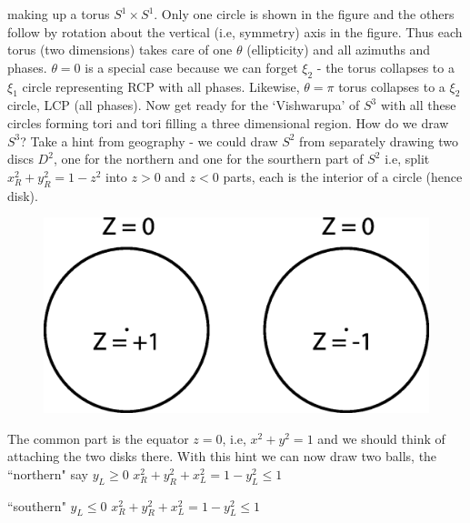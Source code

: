 making up a torus $S^1 \times S^1$. Only one circle is shown in the figure and the others
follow by rotation about the vertical (i.e, symmetry) axis in the figure. Thus
each torus (two dimensions) takes care of one $\theta$ (ellipticity) and all azimuths
and phases. $\theta = 0$ is a special case because we can forget $\xi_2$ - the torus collapses
to a $\xi_1$ circle representing RCP with all phases. Likewise, $\theta = \pi$ torus collapses
to a $\xi_2$ circle, LCP (all phases). Now get ready for the `Vishwarupa' of $S^3$ with
all these circles forming tori and tori filling a three dimensional region. How do
we draw $S^3$? Take a hint from geography - we could draw $S^2$ from separately
drawing two discs $D^2$, one for the northern and one for the sourthern part of
$S^2$ i.e, split $x^2_R + y^2_R = 1 - z^2$ into $z > 0$ and $z < 0$ parts, each is the interior of
a circle (hence disk).

\begin{figure}[H]
\centering
\includegraphics[scale=0.15]{src/images/chap26/14.jpg}
\end{figure}
\bigskip

The common part is the equator $z = 0$, i.e, $x^2 + y^2 = 1$ and we should think
of attaching the two disks there. With this hint we can now draw two balls,
the ~ ``northern" say $y^{\phantom{2}}_{L}  \geq 0$  \quad $x^2_R + y^2_R + x^2_L = 1 - y^2_L \leq 1$
\smallskip

{} \hspace{1.6cm} ``southern" $y^{\phantom{2}}_{L} \leq  0$ \quad  $x^2_R + y^2_R + x^2_L = 1 - y^2_L \leq 1$
\bigskip

